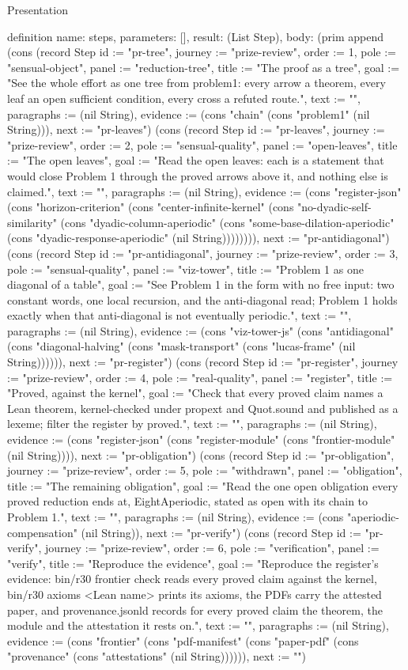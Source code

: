 \begin{lexlean}{Presentation}
\begin{semanticmodule}
definition{
  name: steps,
  parameters: [],
  result: (List Step),
  body: (prim append (cons (record Step {id := "pr-tree", journey := "prize-review", order := 1, pole := "sensual-object", panel := "reduction-tree", title := "The proof as a tree", goal := "See the whole effort as one tree from problem1: every arrow a theorem, every leaf an open sufficient condition, every cross a refuted route.", text := "", paragraphs := (nil String), evidence := (cons "chain" (cons "problem1" (nil String))), next := "pr-leaves"}) (cons (record Step {id := "pr-leaves", journey := "prize-review", order := 2, pole := "sensual-quality", panel := "open-leaves", title := "The open leaves", goal := "Read the open leaves: each is a statement that would close Problem 1 through the proved arrows above it, and nothing else is claimed.", text := "", paragraphs := (nil String), evidence := (cons "register-json" (cons "horizon-criterion" (cons "center-infinite-kernel" (cons "no-dyadic-self-similarity" (cons "dyadic-column-aperiodic" (cons "some-base-dilation-aperiodic" (cons "dyadic-response-aperiodic" (nil String)))))))), next := "pr-antidiagonal"}) (cons (record Step {id := "pr-antidiagonal", journey := "prize-review", order := 3, pole := "sensual-quality", panel := "viz-tower", title := "Problem 1 as one diagonal of a table", goal := "See Problem 1 in the form with no free input: two constant words, one local recursion, and the anti-diagonal read; Problem 1 holds exactly when that anti-diagonal is not eventually periodic.", text := "", paragraphs := (nil String), evidence := (cons "viz-tower-js" (cons "antidiagonal" (cons "diagonal-halving" (cons "mask-transport" (cons "lucas-frame" (nil String)))))), next := "pr-register"}) (cons (record Step {id := "pr-register", journey := "prize-review", order := 4, pole := "real-quality", panel := "register", title := "Proved, against the kernel", goal := "Check that every proved claim names a Lean theorem, kernel-checked under propext and Quot.sound and published as a lexeme; filter the register by proved.", text := "", paragraphs := (nil String), evidence := (cons "register-json" (cons "register-module" (cons "frontier-module" (nil String)))), next := "pr-obligation"}) (cons (record Step {id := "pr-obligation", journey := "prize-review", order := 5, pole := "withdrawn", panel := "obligation", title := "The remaining obligation", goal := "Read the one open obligation every proved reduction ends at, EightAperiodic, stated as open with its chain to Problem 1.", text := "", paragraphs := (nil String), evidence := (cons "aperiodic-compensation" (nil String)), next := "pr-verify"}) (cons (record Step {id := "pr-verify", journey := "prize-review", order := 6, pole := "verification", panel := "verify", title := "Reproduce the evidence", goal := "Reproduce the register's evidence: bin/r30 frontier check reads every proved claim against the kernel, bin/r30 axioms <Lean name> prints its axioms, the PDFs carry the attested paper, and provenance.jsonld records for every proved claim the theorem, the module and the attestation it rests on.", text := "", paragraphs := (nil String), evidence := (cons "frontier" (cons "pdf-manifest" (cons "paper-pdf" (cons "provenance" (cons "attestations" (nil String)))))), next := ""}) }
\end{semanticmodule}
\end{lexlean}
